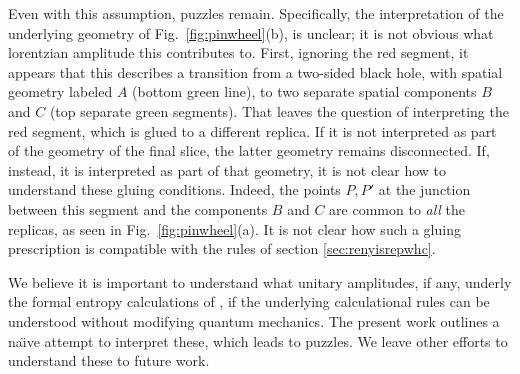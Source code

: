 \documentclass[11pt]{article}
\numberwithin{equation}{section}
\begin{document}
Even with this assumption, puzzles remain. Specifically, 
the interpretation of the underlying geometry of Fig.~\ref{fig:pinwheel}(b), is unclear;  it is not obvious what lorentzian amplitude this contributes to.  First, ignoring the red segment, it appears that this describes a transition from a two-sided black hole, with spatial geometry labeled $A$ (bottom green line), to two separate spatial components $B$ and $C$ (top separate green segments). That leaves the question of interpreting the red segment, which is glued to a different replica.  If it is not interpreted as part of the geometry of the final slice, the latter geometry remains disconnected.  If, instead, it is interpreted as part of that geometry, it is not clear how to understand these gluing conditions.  Indeed, the points $P, P'$ at the junction between this segment and the components $B$ and $C$ are common to {\it all} the replicas, as seen in Fig.~\ref{fig:pinwheel}(a).  It is
 not clear how such a gluing prescription is compatible with the rules of
 section \ref{sec:renyisrepwhc}. 

We believe it is important to understand what  unitary amplitudes, if any, underly the formal entropy calculations of \cite{Penington:2019kki, Almheiri:2019qdq}, if the underlying calculational rules can be understood without modifying quantum mechanics.  The present work outlines a na\"\i ve attempt to interpret these, which leads to puzzles.  We leave other efforts to understand these to future work.



{}
\end{document}
